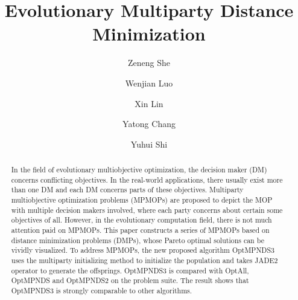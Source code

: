\documentclass[preprint,12pt]{elsarticle}
\begin{document}
\begin{frontmatter}


\title{Evolutionary Multiparty Distance Minimization}



\author[hitsz]{Zeneng She}
\author[hitsz]{Wenjian Luo}
\author[ustc]{Xin Lin}
\author[hitsz]{Yatong Chang}
\author[us]{Yuhui Shi}

\address[hitsz]{School of Computer Science and Technology, Harbin Institute of Technology, Shenzhen 518055, Guangdong, China}
\address[ustc]{School of Computer Science and Technology of the University of Science and Technology of China, Hefei 230027, Anhui, China}
\address[us]{Guangdong Provincial Key Laboratory of Brain-inspired Intelligent Computation, Department of Computer Science and Engineering, Southern University of Science and Technology, Shenzhen 518055, China}
\address{Email: 20s151103@stu.hit.edu.cn, luowenjian@hit.edu.cn, iskcal@mail.ustc.edu.cn, 20s151150@stu.hit.edu.cn, shiyh@sustech.edu.cn}


\begin{abstract}
	In the field of evolutionary multiobjective optimization, the decision maker (DM) concerns conflicting objectives.
	In the real-world applications, there usually exist more than one DM and each DM concerns parts of these objectives.
	Multiparty multiobjective optimization problems (MPMOPs) are proposed to depict the MOP with multiple decision makers involved, where each party concerns about certain some objectives of all.
	However, in the evolutionary computation field, there is not much attention paid on MPMOPs.
	This paper constructs a series of MPMOPs based on distance minimization problems (DMPs), whose Pareto optimal solutions can be vividly visualized.
	To address MPMOPs, the new proposed algorithm OptMPNDS3 uses the multiparty initializing method to initialize the population and takes JADE2 operator to generate the offsprings.
	OptMPNDS3 is compared with OptAll, OptMPNDS and OptMPNDS2 on the problem suite.
	The result shows that OptMPNDS3 is strongly comparable to other algorithms.
\end{abstract}


\end{frontmatter}
\end{document}
